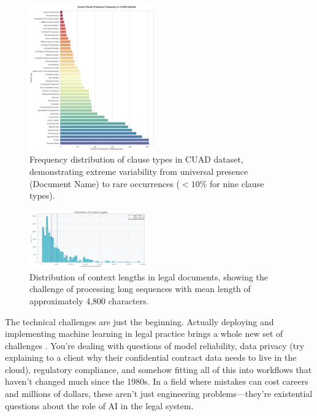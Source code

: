 \begin{figure}[htbp]
\centering
\includegraphics[width=0.48\textwidth]{../figures/clause_presence_frequency.png}
\caption{Frequency distribution of clause types in CUAD dataset, demonstrating extreme variability from universal presence (Document Name) to rare occurrences (\(<10\%\) for nine clause types).}
\label{fig:clause_presence_frequency}
\end{figure}

\begin{figure}[htbp]
\centering
\includegraphics[width=0.45\textwidth]{../figures/context_lengths_distribution.png}
\caption{Distribution of context lengths in legal documents, showing the challenge of processing long sequences with mean length of approximately 4,800 characters.}
\label{fig:context_lengths_distribution}
\end{figure}

The technical challenges are just the beginning. Actually deploying and implementing machine learning in legal practice brings a whole new set of challenges \cite{paleyes2022challenges}. You're dealing with questions of model reliability, data privacy (try explaining to a client why their confidential contract data needs to live in the cloud), regulatory compliance, and somehow fitting all of this into workflows that haven't changed much since the 1980s. In a field where mistakes can cost careers and millions of dollars, these aren't just engineering problems—they're existential questions about the role of AI in the legal system.

